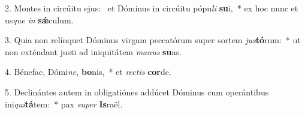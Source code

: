 2. Montes in circúitu ejus: \dag\  et Dóminus in circúitu pópu\textit{li} \textbf{su}i,~*  ex hoc nunc et us\textit{que} \textit{in} \textbf{sǽ}culum.\

3. Quia non relínquet Dóminus virgam peccatórum super sortem \textit{jus}\textbf{tó}rum:~*  ut non exténdant justi ad iniquitátem \textit{ma}\textit{nus} \textbf{su}as.\

4. Bénefac, Dómi\textit{ne}, \textbf{bo}nis,~*  et \textit{rec}\textit{tis} \textbf{cor}de.\

5. Declinántes autem in obligatiónes addúcet Dóminus cum operántibus ini\textit{qui}\textbf{tá}tem:~*  pax \textit{su}\textit{per} \textbf{Is}raël.\

